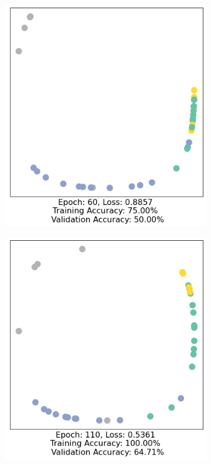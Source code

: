 \documentclass[12pt,a4paper]{report}
\theoremstyle{definition}
\begin{document}
\begin{figure}
\begin{subfigure}[b!]{0.45\textwidth}
    \end{subfigure}
    \begin{subfigure}[b]{0.45\textwidth}
        \centering
        \includegraphics[width=\textwidth]{Images/z_60.png}
    \end{subfigure}
    \hfill
    \begin{subfigure}[b]{0.45\textwidth}
        \centering
        \includegraphics[width=\textwidth]{Images/z_110.png}

\end{subfigure}
\end{figure}
\end{document}

